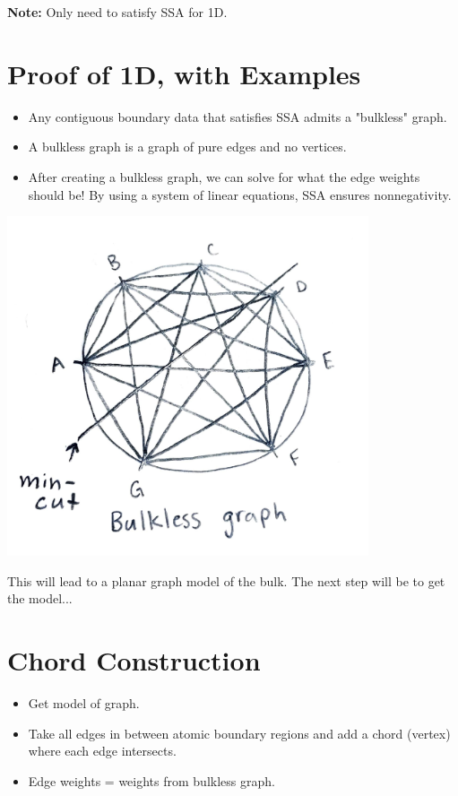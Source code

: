 \documentclass{article}
\begin{document}
\textbf{Note:} Only need to satisfy SSA for 1D.

\section{Proof of 1D, with Examples}
\begin{itemize}
    \item Any contiguous boundary data that satisfies SSA admits a "bulkless" graph.
    \item A bulkless graph is a graph of pure edges and no vertices.
    \item After creating a bulkless graph, we can solve for what the edge weights should be! By using a system of linear equations, SSA ensures nonnegativity.
\end{itemize}


\begin{center}
    \includegraphics[width=0.8\textwidth]{bulkless_graph.pdf}
\end{center}

This will lead to a planar graph model of the bulk. The next step will be to get the model...

\section{Chord Construction}
\begin{itemize}
    \item Get model of graph.
    \item Take all edges in between atomic boundary regions and add a chord (vertex) where each edge intersects.
    \item Edge weights = weights from bulkless graph.
\end{itemize}
\end{document}
